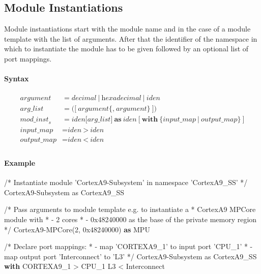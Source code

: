 \documentclass[a4paper,11pt,twoside]{report}
\begin{document}
{{{\subsection{Module Instantiations}
Module instantiations start with the module name and in the case of a module template with the list of arguments.
After that the identifier of the namespace in which to instantiate the module has to be given followed by an optional list of port mappings.

\paragraph{Syntax}
\begin{align*}
    \textit{argument} & \mathop{=}
        \textit{decimal}\ |\ \textit{hexadecimal}\ |\ \textit{iden}\\
    \textit{arg\_list} & \mathop{=}
        \textbf{(}\big[\ 
            \textit{argument}\big\{\textbf{,}\ \textit{argument}\big\}\ 
        \big] \textbf{)}\\
    \textit{mod\_inst}_s & \mathop{=}
        \textit{iden} \big[\textit{arg\_list}\big]\ \textbf{as}\ \textit{iden}\ \big[\ 
            \textbf{with}\ \big\{\textit{input\_map}\ |\ \textit{output\_map}\big\}\ 
        \big]\\
    \textit{input\_map} & \mathop{=}
        \textit{iden}\ \textbf{>}\ \textit{iden}\\
    \textit{output\_map} & \mathop{=}
        \textit{iden}\ \textbf{<}\ \textit{iden}\\
\end{align*}

\clearpage
\paragraph{Example}
\begin{example}
    /* Instantiate module 'CortexA9-Subsystem' in namespace 'CortexA9_SS' */
    CortexA9-Subsystem as CortexA9_SS

    /* Pass arguments to module template e.g. to instantiate a
     * CortexA9 MPCore module with
     * - 2 cores
     * - 0x48240000 as the base of the private memory region
     */
    CortexA9-MPCore(2, 0x48240000) \textbf{as} MPU

    /* Declare port mappings:
     * - map 'CORTEXA9_1' to input port 'CPU_1'
     * - map output port 'Interconnect' to 'L3'
     */
    CortexA9-Subsystem as CortexA9_SS \textbf{with}
        CORTEXA9_1 > CPU_1
        L3 < Interconnect
\end{example}

}}}
\end{document}
